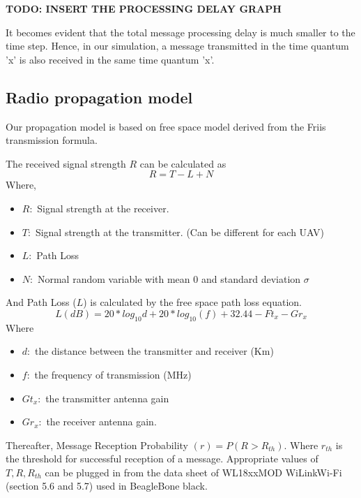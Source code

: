 \textbf{TODO: INSERT THE PROCESSING DELAY GRAPH}

It becomes evident that the total message processing delay is much smaller to the time step. Hence, in our simulation, a message transmitted in the time quantum 'x' is also received in the same time quantum 'x'.

\subsection{Radio propagation model}
Our propagation model is based on free space model derived from the Friis transmission formula. \cite{5735774}

The received signal strength $R$ can be calculated as 
\begin{equation}
    R = T - L + N
\end{equation} 
Where,
\begin{itemize}
    \item $R : $ Signal strength at the receiver.
    \item $T : $ Signal strength at the transmitter. (Can be different for each UAV)
    \item $L : $ Path Loss
    \item $N : $ Normal random variable with mean $0$ and standard deviation $\sigma$
\end{itemize}
And Path Loss ($L$) is calculated by the free space path loss equation.
\begin{equation}
 L (dB) = 20 * log_{10} d + 20 * log_{10}(f) + 32.44 - Ft_x - Gr_x 
\end{equation}
Where
\begin{itemize}
    \item $d : $ the distance between the transmitter and receiver (Km)
	\item $f : $ the frequency of transmission (MHz)
    \item $Gt_x : $ the transmitter antenna gain 
    \item $Gr_x : $ the receiver antenna gain.
\end{itemize}

Thereafter, Message Reception Probability $(r) = P(R > R_{th})$. Where $r_{th}$ is the threshold for successful reception of a message. Appropriate values of $T, R, R_{th}$ can be plugged in from the data sheet of WL18xxMOD WiLink\texttrademark Wi-Fi\textregistered   \cite{wilink} (section 5.6 and 5.7) used in BeagleBone black.

